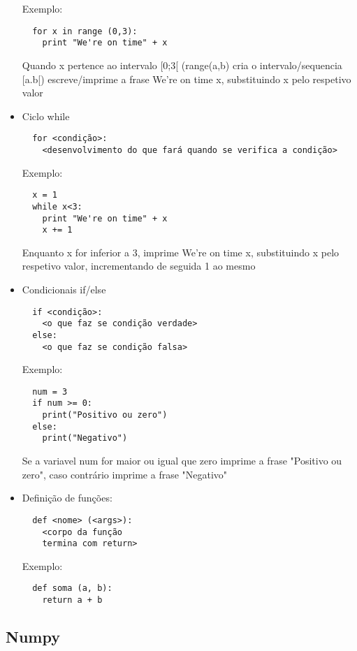 \documentclass{article}
\begin{document}
\begin{itemize}
  Exemplo:
  \begin{lstlisting}
  for x in range (0,3): 
  	print "We're on time" + x 	
  \end{lstlisting}
  Quando x pertence ao intervalo [0;3[ (range(a,b) cria o intervalo/sequencia [a.b[) escreve/imprime a frase We're on time x, substituindo x pelo respetivo valor
  
  \item Ciclo while  
  \begin{lstlisting}
  for <condição>:
	<desenvolvimento do que fará quando se verifica a condição>
  \end{lstlisting} 
  
  Exemplo:
  \begin{lstlisting}
  x = 1  
  while x<3: 
  	print "We're on time" + x
  	x += 1
  \end{lstlisting}
  Enquanto x for inferior a 3, imprime We're on time x, substituindo x pelo respetivo valor, incrementando de seguida 1 ao mesmo
  
  \item Condicionais if/else
  \begin{lstlisting}
  if <condição>:
  	<o que faz se condição verdade>
  else:
  	<o que faz se condição falsa>
  \end{lstlisting}
  
  Exemplo:
  
  \begin{lstlisting}
  num = 3
  if num >= 0:
  	print("Positivo ou zero")
  else:
  	print("Negativo")
  \end{lstlisting}
  Se a variavel num for maior ou igual que zero imprime a frase "Positivo ou zero", caso contr\'ario imprime a frase "Negativo"
  
  \item Defini\c c\~ao de fun\c c\~oes:
  
  \begin{lstlisting}
  def <nome> (<args>):
  	<corpo da função
  	termina com return>
  \end{lstlisting}
  
  Exemplo:
  \begin{lstlisting}
  def soma (a, b):
	return a + b
  \end{lstlisting}  
  
\end{itemize}

\subsection{Numpy}
\end{document}
